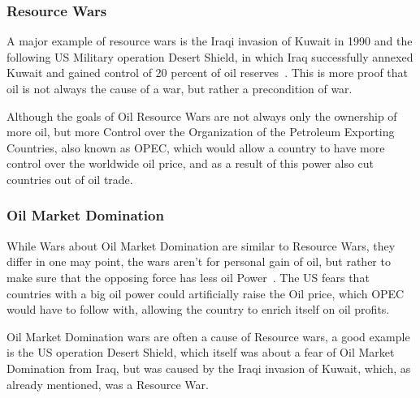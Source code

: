 \subsubsection{Resource Wars}
A major example of resource wars is the Iraqi invasion of Kuwait in 1990 and the following US Military operation Desert Shield, in which Iraq successfully annexed Kuwait and gained control of 20 percent of oil reserves~\cite{history-iraq-kuwait}. This is more proof that oil is not always the cause of a war, but rather a precondition of war.

Although the goals of Oil Resource Wars are not always only the ownership of more oil, but more Control over the Organization of the Petroleum Exporting Countries, also known as OPEC, which would allow a country to have more control over the worldwide oil price, and as a result of this power also cut countries out of oil trade.

\subsubsection{Oil Market Domination}
While Wars about Oil Market Domination are similar to Resource Wars, they differ in one may point, the wars aren't for personal gain of oil, but rather to make sure that the opposing force has less oil Power~\cite{fueling-fire-jeff-d}. The US fears that countries with a big oil power could artificially raise the Oil price, which OPEC would have to follow with, allowing the country to enrich itself on oil profits.

Oil Market Domination wars are often a cause of Resource wars, a good example is the US operation Desert Shield, which itself was about a fear of Oil Market Domination from Iraq, but was caused by the Iraqi invasion of Kuwait, which, as already mentioned, was a Resource War.